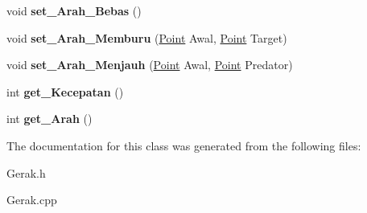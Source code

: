 \begin{DoxyCompactItemize}
\item 
void {\bfseries set\+\_\+\+Arah\+\_\+\+Bebas} ()\hypertarget{class_gerak_a2b06276ef18ad27ab8cbe71655e9c198}{}\label{class_gerak_a2b06276ef18ad27ab8cbe71655e9c198}

\item 
void {\bfseries set\+\_\+\+Arah\+\_\+\+Memburu} (\hyperlink{class_point}{Point} Awal, \hyperlink{class_point}{Point} Target)\hypertarget{class_gerak_a0d31d49a0104e4d823bbfc2881a0f599}{}\label{class_gerak_a0d31d49a0104e4d823bbfc2881a0f599}

\item 
void {\bfseries set\+\_\+\+Arah\+\_\+\+Menjauh} (\hyperlink{class_point}{Point} Awal, \hyperlink{class_point}{Point} Predator)\hypertarget{class_gerak_a8a5617adee7b2c7d67b0f4571ca4b448}{}\label{class_gerak_a8a5617adee7b2c7d67b0f4571ca4b448}

\item 
int {\bfseries get\+\_\+\+Kecepatan} ()\hypertarget{class_gerak_a7c19aee88213b75f332d286458069ccd}{}\label{class_gerak_a7c19aee88213b75f332d286458069ccd}

\item 
int {\bfseries get\+\_\+\+Arah} ()\hypertarget{class_gerak_ae808d0044c5221cf7e265fb43288b51b}{}\label{class_gerak_ae808d0044c5221cf7e265fb43288b51b}

\end{DoxyCompactItemize}


The documentation for this class was generated from the following files\+:\begin{DoxyCompactItemize}
\item 
Gerak.\+h\item 
Gerak.\+cpp\end{DoxyCompactItemize}
